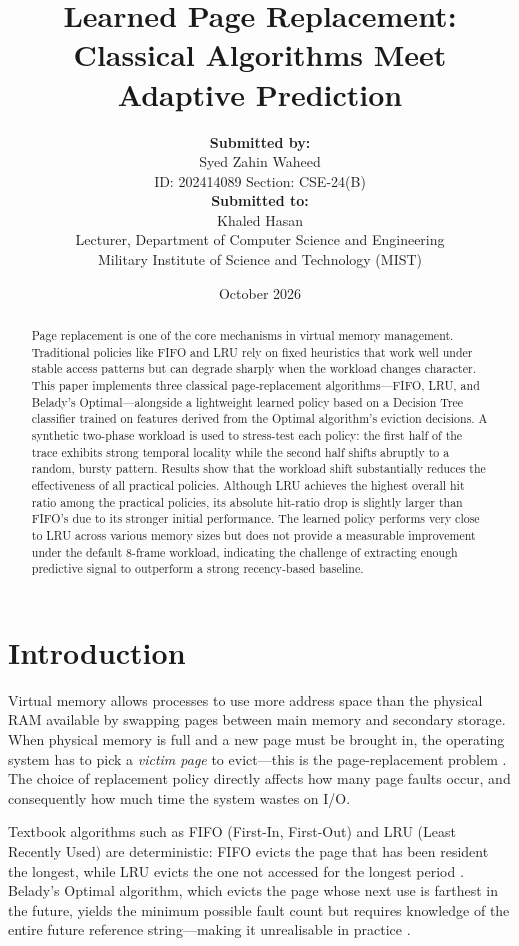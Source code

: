 \documentclass[11pt, a4paper]{article}
\title{%
    Learned Page Replacement:\\
    Classical Algorithms Meet Adaptive Prediction
}
\author{
    \textbf{Submitted by:} \\
    Syed Zahin Waheed \\
    ID: 202414089 \quad Section: CSE-24(B) \\[1em]
    \textbf{Submitted to:} \\
    Khaled Hasan \\
    Lecturer, Department of Computer Science and Engineering \\
    Military Institute of Science and Technology (MIST)
}
\date{October 2026}
\begin{document}
\maketitle

\begin{abstract}
Page replacement is one of the core mechanisms in virtual memory management.
Traditional policies like FIFO and LRU rely on fixed heuristics that work well under stable access patterns but can degrade sharply when the workload changes character.
This paper implements three classical page-replacement algorithms---FIFO, LRU, and Belady's Optimal---alongside a lightweight learned policy based on a Decision Tree classifier trained on features derived from the Optimal algorithm's eviction decisions.
A synthetic two-phase workload is used to stress-test each policy: the first half of the trace exhibits strong temporal locality while the second half shifts abruptly to a random, bursty pattern.
Results show that the workload shift substantially reduces the effectiveness of all practical policies. Although LRU achieves the highest overall hit ratio among the practical policies, its absolute hit-ratio drop is slightly larger than FIFO's due to its stronger initial performance. The learned policy performs very close to LRU across various memory sizes but does not provide a measurable improvement under the default 8-frame workload, indicating the challenge of extracting enough predictive signal to outperform a strong recency-based baseline.
\end{abstract}

\section{Introduction}
\label{sec:intro}

Virtual memory allows processes to use more address space than the physical RAM available by swapping pages between main memory and secondary storage.
When physical memory is full and a new page must be brought in, the operating system has to pick a \emph{victim page} to evict---this is the page-replacement problem \cite{silberschatz2018}.
The choice of replacement policy directly affects how many page faults occur, and consequently how much time the system wastes on I/O.

Textbook algorithms such as FIFO (First-In, First-Out) and LRU (Least Recently Used) are deterministic: FIFO evicts the page that has been resident the longest, while LRU evicts the one not accessed for the longest period \cite{tanenbaum2015}.
Belady's Optimal algorithm, which evicts the page whose next use is farthest in the future, yields the minimum possible fault count but requires knowledge of the entire future reference string---making it unrealisable in practice \cite{belady1966}.
\end{document}
